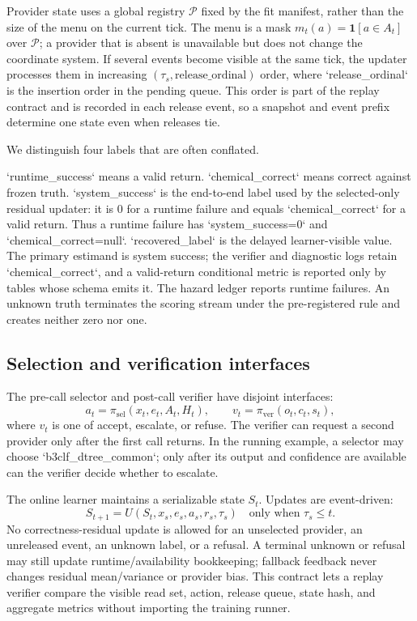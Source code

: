 \documentclass[sigconf,anonymous]{aamas}
\begin{document}
Provider state uses a global registry $\mathcal P$ fixed by the fit manifest, rather than the
size of the menu on the current tick. The menu is a mask $m_t(a)=\mathbf 1[a\in A_t]$ over
$\mathcal P$; a provider that is absent is unavailable but does not change the coordinate system.
If several events become visible at the same tick, the updater processes them in increasing
$(\tau_s,\mathrm{release\_ordinal})$ order, where `release\_ordinal` is the insertion order in
the pending queue. This order is part of the replay contract and is recorded in each release event,
so a snapshot and event prefix determine one state even when releases tie.

We distinguish four labels that are often conflated.\par
`runtime\_success` means a valid return. `chemical\_correct` means correct against frozen truth.
`system\_success` is the end-to-end label used by the selected-only residual updater: it is $0$ for
a runtime failure and equals `chemical\_correct` for a valid return. Thus a runtime failure has
`system\_success=0` and `chemical\_correct=null`. `recovered\_label` is the delayed learner-visible value.
The primary estimand is system success; the verifier and diagnostic logs retain `chemical\_correct`,
and a valid-return conditional metric is reported only by tables whose schema emits it. The hazard
ledger reports runtime failures. An unknown truth terminates the scoring stream under the
pre-registered rule and creates neither zero nor one.

\subsection{Selection and verification interfaces}
The pre-call selector and post-call verifier have disjoint interfaces:
$$
a_t=\pi_{\mathrm{sel}}(x_t,e_t,A_t,H_t),\qquad v_t=\pi_{\mathrm{ver}}(o_t,c_t,s_t),
$$
where $v_t$ is one of accept, escalate, or refuse. The verifier can request a second provider only after the first call returns. In the running example, a selector may choose `b3clf\_dtree\_common`; only after its output and confidence are available can the verifier decide whether to escalate.

The online learner maintains a serializable state $S_t$. Updates are event-driven:
$$
S_{t+1}=U(S_t,x_s,e_s,a_s,r_s,\tau_s)\quad\text{only when }\tau_s\leq t.
$$
No correctness-residual update is allowed for an unselected provider, an unreleased event, an unknown label, or a refusal. A terminal unknown or refusal may still update runtime/availability bookkeeping; fallback feedback never changes residual mean/variance or provider bias. This contract lets a replay verifier compare the visible read set, action, release queue, state hash, and aggregate metrics without importing the training runner.
\end{document}

